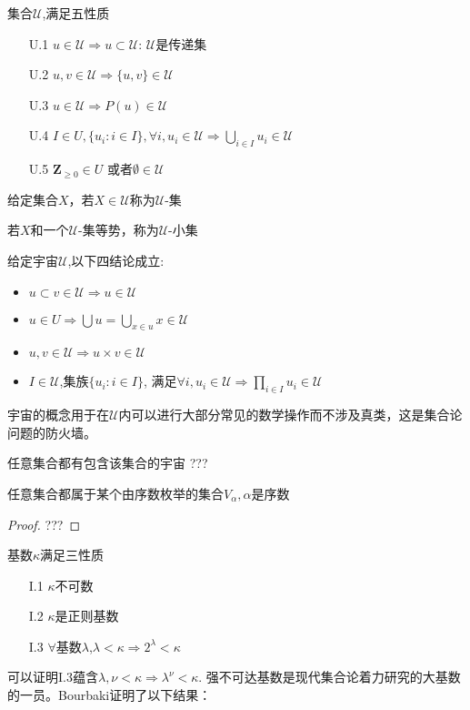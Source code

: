 \begin{Def}[宇宙]集合$\mathcal{U}$,满足五性质
    \begin{enumerate}
        \item[U.1] $u\in \mathcal{U}\Rightarrow u \subset \mathcal{U}$: $\mathcal{U}$是传递集
        \item[U.2] $u,v\in \mathcal{U}\Rightarrow \{u,v\}\in \mathcal{U}$
        \item[U.3] $u\in \mathcal{U}\Rightarrow P(u)\in \mathcal{U}$ 
        \item[U.4] $I\in U, \{u_i:i\in I\}, \forall i, u_i\in \mathcal{U}\Rightarrow \bigcup_{i\in I}u_i \in \mathcal{U}$
        \item[U.5] $\mathbf{Z}_{\geq 0}\in U$ 或者$\emptyset \in \mathcal{U}$ 
    \end{enumerate}
\end{Def}
    给定集合$X$，若$X\in \mathcal{U}$称为$\mathcal{U}$-集

    若$X$和一个$\mathcal{U}$-集等势，称为$\mathcal{U}$-小集

    给定宇宙$\mathcal{U}$,以下四结论成立:
    \begin{itemize}
        \item $u \subset v \in \mathcal{U}\Rightarrow u\in \mathcal{U}$
        \item $u\in U\Rightarrow \bigcup u =\bigcup_{x\in u}x\in \mathcal{U}$
        \item $u,v\in \mathcal{U}\Rightarrow u\times v \in \mathcal{U}$
        \item $I\in \mathcal{U}$,集族$\{u_i:i\in I\}$, 满足$\forall i,u_i \in \mathcal{U}\Rightarrow \prod_{i\in I}u_i \in \mathcal{U}$
    \end{itemize}
    宇宙的概念用于在$\mathcal{U}$内可以进行大部分常见的数学操作而不涉及真类，这是集合论问题的防火墙。

\begin{Asum}任意集合都有包含该集合的宇宙
    ???
\end{Asum}

\begin{Prop} 任意集合都属于某个由序数枚举的集合$V_{\alpha},\alpha$是序数
    \begin{proof}
        ???
    \end{proof}
\end{Prop}

\begin{Def}[强不可达基数]基数$\kappa$满足三性质
    \begin{enumerate}
        \item[I.1] $\kappa$不可数
        \item[I.2] $\kappa$是正则基数
        \item[I.3] $\forall$基数$\lambda$,$\lambda<\kappa \Rightarrow 2^{\lambda}<\kappa$  
    \end{enumerate}
\end{Def}
    可以证明I.3蕴含$\lambda,\nu <\kappa\Rightarrow \lambda^\nu < \kappa$.
    强不可达基数是现代集合论着力研究的大基数的一员。Bourbaki证明了以下结果：

